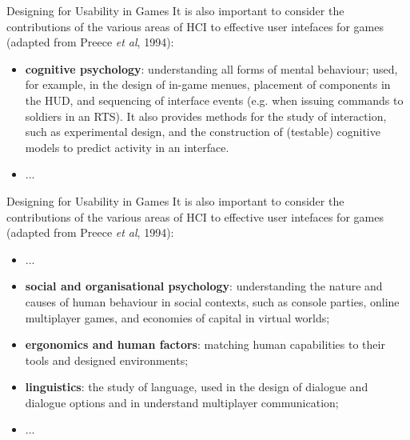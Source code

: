 \begin{frame}{Designing for Usability in Games}
	It is also important to consider the contributions of the various areas of HCI to effective user intefaces for games 
	(adapted from Preece \textit{et al}, 1994):

	\begin{itemize}
		\item \textbf{cognitive psychology}: understanding all forms of mental behaviour; used, for example, in the design of in-game menues,
		placement of components in the HUD, and sequencing of interface events (e.g. when issuing commands to soldiers in an RTS). It also provides
		methods for the study of interaction, such as experimental design, and the construction of (testable) cognitive models to predict activity in
		an interface. \pause
		
		\item ...
		
	\end{itemize}
\end{frame}

\begin{frame}{Designing for Usability in Games}
	It is also important to consider the contributions of the various areas of HCI to effective user intefaces for games 
	(adapted from Preece \textit{et al}, 1994):

	\begin{itemize}
		\item ...
		
		\item \textbf{social and organisational psychology}: understanding the nature and causes of human behaviour in social contexts, such as
		console parties, online multiplayer games, and economies of capital in virtual worlds; \pause
		
		\item \textbf{ergonomics and human factors}: matching human capabilities to their tools and designed environments; \pause
		
		\item \textbf{linguistics}: the study of language, used in the design of dialogue and dialogue options and in understand multiplayer communication; \pause
		
		\item ...
	\end{itemize}
\end{frame}

